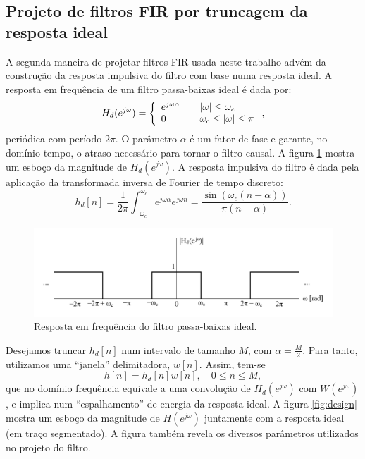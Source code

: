 \subsection*{Projeto de filtros FIR por truncagem da resposta ideal}
A segunda maneira de projetar filtros FIR usada neste trabalho advém da construção da resposta impulsiva do filtro com base numa resposta ideal. A resposta em frequência de um filtro passa-baixas ideal é dada por:
\begin{equation}
     H_d(e^{j\omega}) = \left\{
     \begin{array}{l l}
         e^{j\omega\alpha} & \quad |\omega| \leq \omega_c\\
         0                 & \quad \omega_c \leq |\omega| \leq \pi
     \end{array} \right.,
\end{equation}
periódica com período $2\pi$. O parâmetro $\alpha$ é um fator de fase e garante, no domínio tempo, o atraso necessário para tornar o filtro causal. A figura \ref{fig:ideal} mostra um esboço da magnitude de $H_d(e^{j\omega})$. A resposta impulsiva do filtro é dada pela aplicação da transformada inversa de Fourier de tempo discreto:
\begin{equation}
     h_d[n] = \frac{1}{2\pi}\int_{-\omega_c}^{\omega_c} e^{j\omega\alpha}e^{j\omega n} = \frac{\sin \left( \omega_c \left(n-\alpha\right) \right)}{\pi \left(n-\alpha\right)}.
     \label{equ:impresp}
\end{equation}

\begin{figure}[ht!]
    \centering
    \includegraphics[width=400pt]{figures/chap3-ideal-lowpass.pdf}
    \caption[Resposta em frequência do filtro passa-baixas ideal]{Resposta em frequência do filtro passa-baixas ideal.}
    \label{fig:ideal}
\end{figure}

Desejamos truncar $h_d[n]$ num intervalo de tamanho $M$, com $\alpha=\frac{M}{2}$. Para tanto, utilizamos uma ``janela'' delimitadora, $w[n]$. Assim, tem-se
\begin{equation}
     h[n] = h_d[n]w[n], \quad 0\leq n \leq M,
     \label{equ:trunc}
\end{equation}
que no domínio frequência equivale a uma convolução de $H_d(e^{j\omega})$ com $W(e^{j\omega})$, e implica num ``espalhamento'' de energia da resposta ideal. A figura \ref{fig:design} mostra um esboço da magnitude de $H(e^{j\omega})$ juntamente com a resposta ideal (em traço segmentado). A figura também revela os diversos parâmetros utilizados no projeto do filtro.

